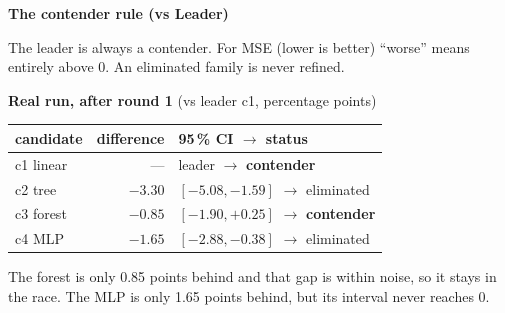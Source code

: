 \documentclass[11pt]{article}
\newcommand{\note}[1]{{\small\color{black!62}#1}}
\begin{document}
\vspace{8pt}
\begin{minipage}[t]{0.47\linewidth}
\vspace{0pt}
\textbf{The contender rule (vs Leader)}\par\vspace{4pt}
\par\vspace{3pt}
\note{The leader is always a contender. For MSE (lower is better) ``worse'' means entirely above 0.
An eliminated family is never refined.}
\end{minipage}\hfill
\begin{minipage}[t]{0.49\linewidth}
\vspace{0pt}
\textbf{Real run, after round 1} \note{(vs leader c1, percentage points)}\par\vspace{3pt}
{\small
\begin{tabular}{@{}l r l@{}}
\toprule
candidate & difference & 95\,\% CI $\rightarrow$ status\\ \midrule
c1 linear & --- & leader $\rightarrow$ \textbf{contender}\\
c2 tree & $-3.30$ & $[-5.08, -1.59]$ $\rightarrow$ eliminated\\
c3 forest & $-0.85$ & $[-1.90, +0.25]$ $\rightarrow$ \textbf{contender}\\
c4 MLP & $-1.65$ & $[-2.88, -0.38]$ $\rightarrow$ eliminated\\
\bottomrule
\end{tabular}}
\par\vspace{4pt}
\note{The forest is only 0.85 points behind and that gap is within noise, so it stays in the race.
The MLP is only 1.65 points behind, but its interval never reaches 0.}
\end{minipage}
\end{document}
